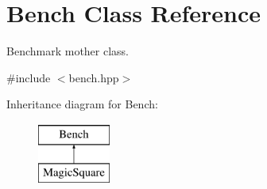 \hypertarget{classBench}{\section{\-Bench \-Class \-Reference}
\label{classBench}
}


\-Benchmark mother class.  




{\ttfamily \#include $<$bench.\-hpp$>$}

\-Inheritance diagram for \-Bench\-:\begin{figure}[H]
\begin{center}
\leavevmode
\includegraphics[height=2.000000cm]{classBench}
\end{center}
\end{figure}
